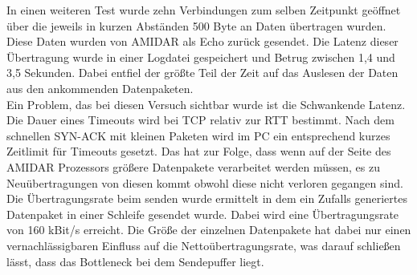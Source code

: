 In einen weiteren Test wurde zehn Verbindungen zum selben Zeitpunkt geöffnet über die jeweils in kurzen Abständen 500 Byte an Daten übertragen wurden. Diese Daten wurden von AMIDAR als Echo zurück gesendet. Die Latenz dieser Übertragung wurde in einer Logdatei gespeichert und Betrug zwischen 1,4 und 3,5 Sekunden. Dabei entfiel der größte Teil der Zeit auf das Auslesen der Daten aus den ankommenden Datenpaketen.\\
Ein Problem, das bei diesen Versuch sichtbar wurde ist die Schwankende Latenz. Die Dauer eines Timeouts wird bei TCP relativ zur RTT bestimmt. Nach dem schnellen SYN-ACK mit kleinen Paketen wird im PC ein entsprechend kurzes Zeitlimit für Timeouts gesetzt. Das hat zur Folge, dass wenn auf der Seite des AMIDAR Prozessors größere Datenpakete verarbeitet werden müssen, es zu Neuübertragungen von diesen kommt obwohl diese nicht verloren gegangen sind.\\

Die Übertragungsrate beim senden wurde ermittelt in dem ein Zufalls generiertes Datenpaket in einer Schleife gesendet wurde. Dabei wird eine Übertragungsrate von 160 kBit/s erreicht. Die Größe der einzelnen Datenpakete hat dabei nur einen vernachlässigbaren Einfluss auf die Nettoübertragungsrate, was darauf schließen lässt, dass das Bottleneck bei dem Sendepuffer liegt. 




 

 